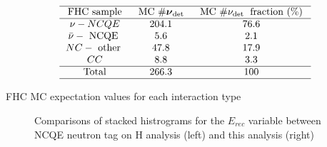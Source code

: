 \begin{table}
    $$
    \begin{array}{ccc}
    \hline \text { FHC sample } & \text { MC } \# \boldsymbol{\nu}_{\text {det }} & \text { MC } \# \nu_{\text {det }} \text { fraction (\%) } \\
    \hline \nu-N C Q E & 204.1 & 76.6 \\
    \bar{\nu}-\text { NCQE } & 5.6 & 2.1 \\
    N C-\text { other } & 47.8 & 17.9 \\
    C C & 8.8 & 3.3 \\
    \hline \text { Total } & 266.3 & 100 \\
    \hline
    \end{array}
    $$
    \caption{FHC MC expectation values for each interaction type}
    \label{table:nu_FHC_mc_chp6}
\end{table}


\begin{figure}[!htbp]
    \centering
    
    \caption{Comparisons of stacked histrograms for the $E_{rec}$ variable between NCQE neutron tag on H analysis (left) and this analysis (right)} \label{fig:erec_reduction} 
    
      \hfill 
     \par
    
        
\end{figure}

